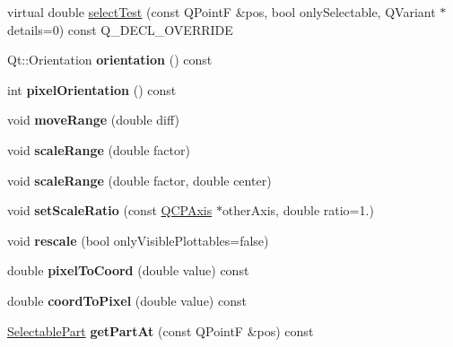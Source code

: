 \begin{DoxyCompactItemize}
\item 
virtual double \hyperlink{class_q_c_p_axis_ad5db8e8f406fa52621d6cb7b35b9d63c}{select\+Test} (const Q\+PointF \&pos, bool only\+Selectable, Q\+Variant $\ast$details=0) const Q\+\_\+\+D\+E\+C\+L\+\_\+\+O\+V\+E\+R\+R\+I\+DE
\item 
\mbox{\label{class_q_c_p_axis_ab988ef4538e2655bb77bd138189cd42e}} 
Qt\+::\+Orientation {\bfseries orientation} () const
\item 
\mbox{\label{class_q_c_p_axis_a45c45bed7e5666683b8d56afa66fa51f}} 
int {\bfseries pixel\+Orientation} () const
\item 
\mbox{\label{class_q_c_p_axis_a18f3a68f2b691af1fd34b6593c886630}} 
void {\bfseries move\+Range} (double diff)
\item 
\mbox{\label{class_q_c_p_axis_a31d18ddf3a4f21ceb077db8ae5b69856}} 
void {\bfseries scale\+Range} (double factor)
\item 
\mbox{\label{class_q_c_p_axis_a7072ff96fe690148f1bbcdb4f773ea1c}} 
void {\bfseries scale\+Range} (double factor, double center)
\item 
\mbox{\label{class_q_c_p_axis_af4bbd446dcaee5a83ac30ce9bcd6e125}} 
void {\bfseries set\+Scale\+Ratio} (const \hyperlink{class_q_c_p_axis}{Q\+C\+P\+Axis} $\ast$other\+Axis, double ratio=1.)
\item 
\mbox{\label{class_q_c_p_axis_a499345f02ebce4b23d8ccec96e58daa9}} 
void {\bfseries rescale} (bool only\+Visible\+Plottables=false)
\item 
\mbox{\label{class_q_c_p_axis_a536ef8f624cac59b6b6fdcb495723c57}} 
double {\bfseries pixel\+To\+Coord} (double value) const
\item 
\mbox{\label{class_q_c_p_axis_af15d1b3a7f7e9b53d759d3ccff1fe4b4}} 
double {\bfseries coord\+To\+Pixel} (double value) const
\item 
\mbox{\label{class_q_c_p_axis_a0961dd19dfc79015c55d30003c82b258}} 
\hyperlink{class_q_c_p_axis_abee4c7a54c468b1385dfce2c898b115f}{Selectable\+Part} {\bfseries get\+Part\+At} (const Q\+PointF \&pos) const

\end{DoxyCompactItemize}
